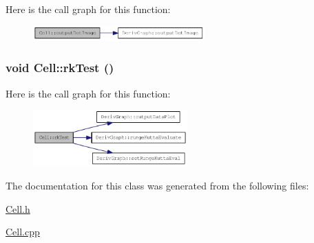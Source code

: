 Here is the call graph for this function:\nopagebreak
\begin{figure}[H]
\begin{center}
\leavevmode
\includegraphics[width=187pt]{classCell_a535ddddc0471fa874a0b22a54bd38c1a_cgraph}
\end{center}
\end{figure}
\hypertarget{classCell_a23f164fa204f67b79256636bfdae1e75}{
\subsubsection[{rkTest}]{\setlength{\rightskip}{0pt plus 5cm}void Cell::rkTest ()}}
\label{classCell_a23f164fa204f67b79256636bfdae1e75}


Here is the call graph for this function:\nopagebreak
\begin{figure}[H]
\begin{center}
\leavevmode
\includegraphics[width=168pt]{classCell_a23f164fa204f67b79256636bfdae1e75_cgraph}
\end{center}
\end{figure}


The documentation for this class was generated from the following files:\begin{DoxyCompactItemize}
\item 
\hyperlink{Cell_8h}{Cell.h}\item 
\hyperlink{Cell_8cpp}{Cell.cpp}\end{DoxyCompactItemize}
